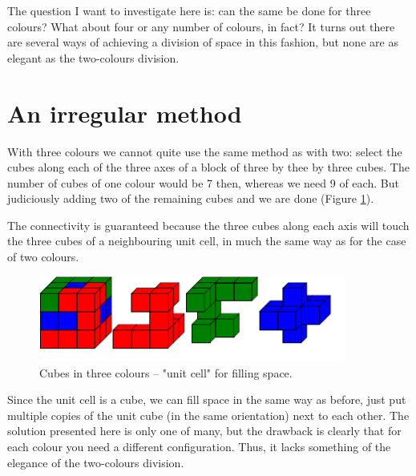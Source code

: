 \documentclass[onecolumn]{article}
\begin{document}
The question I want to investigate here is: can the same be done for three colours? What about
four or any number of colours, in fact? It turns out there are several ways of achieving a
division of space in this fashion, but none are as elegant as the two-colours division.


\section*{An irregular method}
With three colours we cannot quite use the same method as with two: select the cubes along
each of the three axes of a block of three by thee by three cubes. The number of cubes of
one colour would be 7 then, whereas we need 9 of each. But judiciously adding two of the
remaining cubes and we are done (Figure \ref{irregular_three_colours}).

The connectivity is guaranteed because the three cubes along each axis will touch the
three cubes of a neighbouring unit cell, in much the same way as for the case of two colours.

\begin{figure}
\center
\caption{Cubes in three colours -- "unit cell" for filling space.}
\label{irregular_three_colours}
\includegraphics[width=0.9\textwidth]{irregular_three_colours.pdf}
\end{figure}

Since the unit cell is a cube, we can fill space in the same way as before, just put multiple
copies of the unit cube (in the same orientation) next to each other. The solution presented
here is only one of many, but the drawback is clearly that for each colour you need a different
configuration. Thus, it lacks something of the elegance of the two-colours division.
\end{document}
